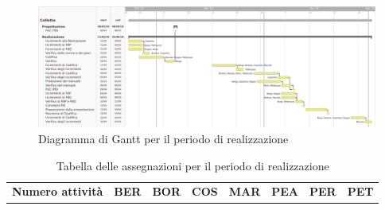 	
	\newpage
	\begin{figure}[!hbtp]
		\centering
		\includegraphics[scale=0.5, angle=90]{images/ganttreal.png}
		\caption{Diagramma di Gantt per il periodo di realizzazione}
	\end{figure}
	\begin{table}
		\caption{Tabella delle assegnazioni per il periodo di realizzazione}
		\centering		
		\begin{tabular}{| >{\centering}p{1.5cm} | c | c | c | c | c | c | c |}
			\rowcolor{LightBlue}
			\textbf{\color{white}Numero attività} 
			& \textbf{\color{white}BER} 
			& \textbf{\color{white}BOR} 
			& \textbf{\color{white}COS} 
			& \textbf{\color{white}MAR} 
			& \textbf{\color{white}PEA} 
			& \textbf{\color{white}PER} 
			& \textbf{\color{white}PET}\\
			

\end{tabular}
\end{table}
